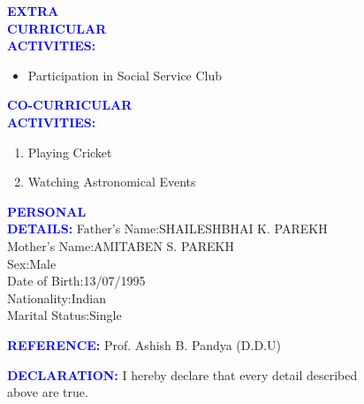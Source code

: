 \documentclass{article}
\begin{document}
\begin{flushleft}
	\textcolor{blue}{\textbf{EXTRA\\ CURRICULAR\\ ACTIVITIES:}}
	\begin{itemize}
		\vspace{-0.29in}
		\addtolength{\itemindent}{1.0in}
		\item Participation in Social Service Club 
	\end{itemize}
\end{flushleft}
\begin{flushleft}
	\textcolor{blue}{\textbf{CO-CURRICULAR\\ ACTIVITIES:}}
	\begin{enumerate}
		\vspace{-0.29in}
		\addtolength{\itemindent}{1.0in}
		\item Playing Cricket
		\item Watching Astronomical Events
	\end{enumerate}
\end{flushleft}
\begin{flushleft}
	\textcolor{blue}{\textbf{PERSONAL\\ DETAILS:}}
	\hspace{1.02in}
	Father's Name:\hspace{0.1in}SHAILESHBHAI K. PAREKH\\	
	\hspace{1.8in}
	Mother's Name:\hspace{0.06in}AMITABEN S. PAREKH\\
	\hspace{1.8in}
	Sex:\hspace{0.78in}Male\\
	\hspace{1.8in}
	Date of Birth:\hspace{0.16in}13/07/1995\\
	\hspace{1.8in}
	Nationality:\hspace{0.3in}Indian\\
	\hspace{1.8in}
	Marital Status:\hspace{0.1in}Single\\
\end{flushleft}
\begin{flushleft}
	\textcolor{blue}{\textbf{REFERENCE:}}
	\hspace{0.7in}
	Prof. Ashish B. Pandya (D.D.U)
\end{flushleft}
\begin{flushleft}
	\textcolor{blue}{\textbf{DECLARATION:}}
	\hspace{0.5in}
	I hereby declare that every detail described\\ \hspace{1.77in} above are true.
\end{flushleft}
\end{document}
